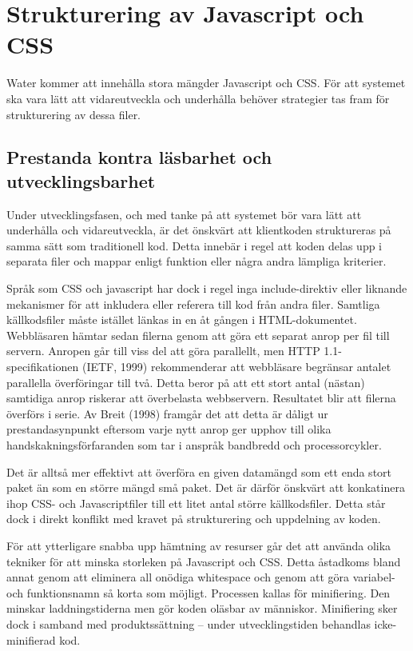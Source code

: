 \section{Strukturering av Javascript och CSS}

Water kommer att innehålla stora mängder Javascript och CSS. För att systemet ska vara lätt att vidareutveckla och underhålla behöver strategier tas fram för strukturering av dessa filer.

\subsection{Prestanda kontra läsbarhet och utvecklingsbarhet}

Under utvecklingsfasen, och med tanke på att systemet bör vara lätt att underhålla och vidareutveckla, är det önskvärt att klientkoden struktureras på samma sätt som traditionell kod. Detta innebär i regel att koden delas upp i separata filer och mappar enligt funktion eller några andra lämpliga kriterier.

Språk som CSS och javascript har dock i regel inga include-direktiv eller liknande mekanismer för att inkludera eller referera till kod från andra filer. Samtliga källkodsfiler måste istället länkas in en åt gången i HTML-dokumentet. 
Webbläsaren hämtar sedan filerna genom att göra ett separat anrop per fil till servern. Anropen går till viss del att göra parallellt, men HTTP 1.1-specifikationen (IETF, 1999) rekommenderar att webbläsare begränsar antalet parallella överföringar till två. Detta beror på att ett stort antal (nästan) samtidiga anrop riskerar att överbelasta webbservern. Resultatet blir att filerna överförs i serie. Av Breit (1998) framgår det att detta är dåligt ur prestandasynpunkt eftersom varje nytt anrop ger upphov till olika handskakningsförfaranden som tar i anspråk bandbredd och processorcykler. 

Det är alltså mer effektivt att överföra en given datamängd som ett enda stort paket än som en större mängd små paket. Det är därför önskvärt att konkatinera ihop CSS- och Javascriptfiler till ett litet antal större källkodsfiler. Detta står dock i direkt konflikt med kravet på strukturering och uppdelning av koden.

För att ytterligare snabba upp hämtning av resurser går det att använda olika tekniker för att minska storleken på Javascript och CSS. Detta åstadkoms bland annat genom att eliminera all onödiga whitespace och genom att göra variabel- och funktionsnamn så korta som möjligt. Processen kallas för minifiering. Den minskar laddningstiderna men gör koden oläsbar av människor. Minifiering sker dock i samband med produktssättning – under utvecklingstiden behandlas icke-minifierad kod.

